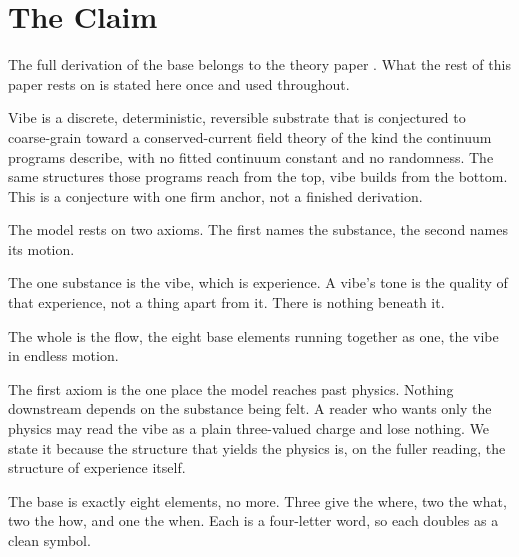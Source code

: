 \section{The Claim}

The full derivation of the base belongs to the theory paper \cite{pollard2026vibe}. What the rest of this paper rests on is stated here once and used throughout.

Vibe is a discrete, deterministic, reversible substrate that is conjectured to coarse-grain toward a conserved-current field theory of the kind the continuum programs describe, with no fitted continuum constant and no randomness. The same structures those programs reach from the top, vibe builds from the bottom. This is a conjecture with one firm anchor, not a finished derivation.

The model rests on two axioms. The first names the substance, the second names its motion.

\begin{axiom}
The one substance is the vibe, which is experience. A vibe's tone is the quality of that experience, not a thing apart from it. There is nothing beneath it.
\end{axiom}

\begin{axiom}
The whole is the flow, the eight base elements running together as one, the vibe in endless motion.
\end{axiom}

The first axiom is the one place the model reaches past physics. Nothing downstream depends on the substance being felt. A reader who wants only the physics may read the vibe as a plain three-valued charge and lose nothing. We state it because the structure that yields the physics is, on the fuller reading, the structure of experience itself.

The base is exactly eight elements, no more. Three give the where, two the what, two the how, and one the when. Each is a four-letter word, so each doubles as a clean symbol.

